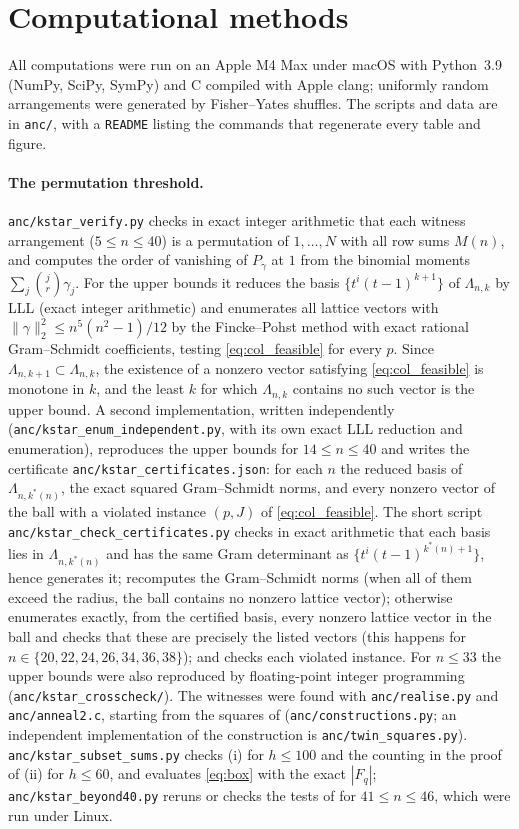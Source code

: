 \section{Computational methods}
\label{sec:appendix}

All computations were run on an Apple M4 Max under macOS with Python~3.9 (NumPy, SciPy, SymPy) and C compiled with Apple clang; uniformly random arrangements were generated by Fisher--Yates shuffles.
The scripts and data are in \texttt{anc/}, with a \texttt{README} listing the commands that regenerate every table and figure.

\paragraph{The permutation threshold.}
\texttt{anc/kstar\_verify.py} checks in exact integer arithmetic that each witness arrangement ($5\le n\le40$) is a permutation of $1,\dots,N$ with all row sums $M(n)$, and computes the order of vanishing of $P_\gamma$ at $1$ from the binomial moments $\sum_j\binom jr\gamma_j$.
For the upper bounds it reduces the basis $\{t^i(t-1)^{k+1}\}$ of $\Lambda_{n,k}$ by LLL (exact integer arithmetic) and enumerates all lattice vectors with $\|\gamma\|_2^2\le n^5(n^2-1)/12$ by the Fincke--Pohst method with exact rational Gram--Schmidt coefficients, testing \eqref{eq:col_feasible} for every $p$.
Since $\Lambda_{n,k+1}\subset\Lambda_{n,k}$, the existence of a nonzero vector satisfying \eqref{eq:col_feasible} is monotone in $k$, and the least $k$ for which $\Lambda_{n,k}$ contains no such vector is the upper bound.
A second implementation, written independently (\texttt{anc/kstar\_enum\_independent.py}, with its own exact LLL reduction and enumeration), reproduces the upper bounds for $14\le n\le40$ and writes the certificate \texttt{anc/kstar\_certificates.json}: for each $n$ the reduced basis of $\Lambda_{n,k^*(n)}$, the exact squared Gram--Schmidt norms, and every nonzero vector of the ball with a violated instance $(p,J)$ of \eqref{eq:col_feasible}.
The short script \texttt{anc/kstar\_check\_certificates.py} checks in exact arithmetic that each basis lies in $\Lambda_{n,k^*(n)}$ and has the same Gram determinant as $\{t^i(t-1)^{k^*(n)+1}\}$, hence generates it; recomputes the Gram--Schmidt norms (when all of them exceed the radius, the ball contains no nonzero lattice vector); otherwise enumerates exactly, from the certified basis, every nonzero lattice vector in the ball and checks that these are precisely the listed vectors (this happens for $n\in\{20,22,24,26,34,36,38\}$); and checks each violated instance.
For $n\le33$ the upper bounds were also reproduced by floating-point integer programming (\texttt{anc/kstar\_crosscheck/}).
The witnesses were found with \texttt{anc/realise.py} and \texttt{anc/anneal2.c}, starting from the squares of  (\texttt{anc/constructions.py}; an independent implementation of the construction is \texttt{anc/twin\_squares.py}).
\texttt{anc/kstar\_subset\_sums.py} checks (i) for $h\le100$ and the counting in the proof of (ii) for $h\le60$, and evaluates \eqref{eq:box} with the exact $|F_q|$; \texttt{anc/kstar\_beyond40.py} reruns or checks the tests of  for $41\le n\le46$, which were run under Linux.

